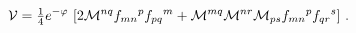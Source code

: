 \begin{equation}
 {\cal V} = {\textstyle\frac{1}{4}} e^{-\varphi}\,
             \left[ 2{\cal M}^{nq}f_{mn}{}^{p} f_{pq}{}^{m}
                  + {\cal M}^{mq}{\cal M}^{nr}{\cal M}_{ps}
                  f_{mn}{}^{p}f_{qr}{}^{s}
             \right]\, .
\label{eq:potential-1}
\end{equation}

